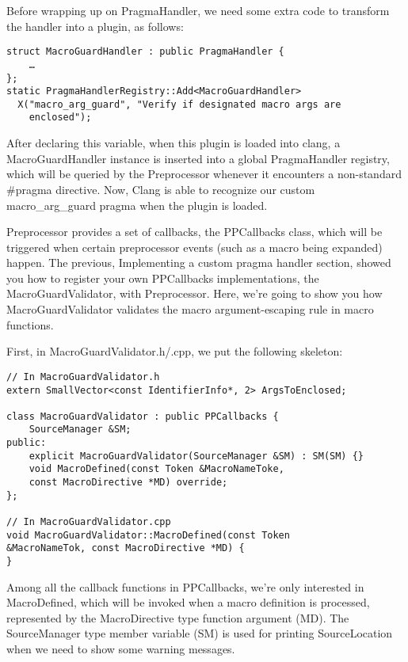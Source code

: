 Before wrapping up on PragmaHandler, we need some extra code to transform the handler into a plugin, as follows:

\begin{lstlisting}[style=styleCXX]
struct MacroGuardHandler : public PragmaHandler {
	…
};
static PragmaHandlerRegistry::Add<MacroGuardHandler>
  X("macro_arg_guard", "Verify if designated macro args are
    enclosed");
\end{lstlisting}

After declaring this variable, when this plugin is loaded into clang, a MacroGuardHandler instance is inserted into a global PragmaHandler registry, which will be queried by the Preprocessor whenever it encounters a non-standard \#pragma directive. Now, Clang is able to recognize our custom macro\_arg\_guard pragma when the plugin is loaded.


Preprocessor provides a set of callbacks, the PPCallbacks class, which will be triggered when certain preprocessor events (such as a macro being expanded) happen. The previous, Implementing a custom pragma handler section, showed you how to register your own PPCallbacks implementations, the MacroGuardValidator, with Preprocessor. Here, we're going to show you how MacroGuardValidator validates the macro argument-escaping rule in macro functions.

First, in MacroGuardValidator.h/.cpp, we put the following skeleton:

\begin{lstlisting}[style=styleCXX]
// In MacroGuardValidator.h
extern SmallVector<const IdentifierInfo*, 2> ArgsToEnclosed;

class MacroGuardValidator : public PPCallbacks {
	SourceManager &SM;
public:
	explicit MacroGuardValidator(SourceManager &SM) : SM(SM) {}
	void MacroDefined(const Token &MacroNameToke,
	const MacroDirective *MD) override;
};

// In MacroGuardValidator.cpp
void MacroGuardValidator::MacroDefined(const Token
&MacroNameTok, const MacroDirective *MD) {
}
\end{lstlisting}

Among all the callback functions in PPCallbacks, we're only interested in MacroDefined, which will be invoked when a macro definition is processed, represented by the MacroDirective type function argument (MD). The SourceManager type member variable (SM) is used for printing SourceLocation when we need to show some warning messages.

